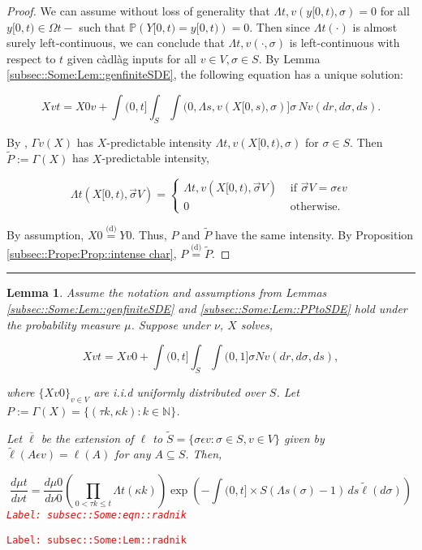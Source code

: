 \documentclass[12pt]{article}
\newcommand{\mb}{\mathbb}
\newcommand{\ov}{\overline}
\newcommand{\te}{\text}
\newcommand{\ep}{\epsilon}
\newcommand{\tr}{\textcolor{red}}
\newcommand{\labe}[1]{\tr{\texttt{Label: #1}}}
\newcommand{\ind}{\hspace{24pt}}
\newcommand{\lin}{\rule{\linewidth}{0.4 pt}}
\newcommand{\pr}{\mb{P}}							%
\newcommand{\deq}{\overset{\text{(d)}}{=}}			%
\newcommand{\defeq}{:=}								%
\renewcommand{\v}{v}							%
\renewcommand{\S}{S}							%
\newcommand{\s}{\sigma}							%
\newcommand{\sv}{\vec{\s}}						%
\newcommand{\ev}{\ep}							%
\renewcommand{\t}{t}							%
\renewcommand{\tt}{s}							%
\newcommand{\X}{X}								%
\newcommand{\poiss}{N}							%
\newcommand{\Sm}{\ell}							%
\renewcommand{\r}{r}							%
\newcommand{\alt}[1]{\widetilde{#1}}			%
\newcommand{\m}{\mu}							%
\newcommand{\mm}{\nu}							%
\newcommand{\XX}{Y}								%
\newcommand{\rt}{\tau}							%
\renewcommand{\it}{k}							%
\newcommand{\pmap}{\Gamma}						%
\renewcommand{\mark}{\kappa}					%
\newcommand{\rp}{P}								%
\newcommand{\typset}{A}							%
\newcommand{\ratee}{\Lambda}					%
\newcommand{\xx}{y}								%
\newtheorem{lem}[thms]{Lemma}
\begin{document}
\begin{proof}

We can assume without loss of generality that \(\ratee{\t,\v}(\xx{}{[0,\t)},\s) = 0\) for all \(\xx{}{[0,\t)}\in \Omega{}{\t-}\) such that \(\pr(\XX{}{[0,\t)} = \xx{}{[0,\t)}) = 0\). Then since \(\ratee{\t}(\cdot)\) is almost surely left-continuous, we can conclude that \(\ratee{\t,\v}(\cdot,\s)\) is left-continuous with respect to \(\t\) given c\`adl\`ag inputs for all \(\v\in V,\s\in\S\). By Lemma \ref{subsec::Some:Lem::genfiniteSDE}, the following equation has a unique solution:

\[\X{\v}{\t} = \X{0}{\v} + \int{(0,\t]}\int_\S\int{(0,\ratee{\tt,\v}(\X{}{[0,\tt)},\s)]}  \s\,\poiss{\v}(d\r,d\s,d\tt).\]

By \cite[Exercise 14.7.1]{DalVer08}, \(\pmap{\v}(\X{}{})\) has \(\X{}{}\)-predictable intensity \(\ratee{\t,\v}(\X{}{[0,\t)},\s)\) for \(\s \in \S\). Then \(\alt{\rp{}} \defeq \pmap{}(\X{}{})\) has \(\X{}{}\)-predictable intensity,

\[\ratee{\t}(\X{}{[0,\t)},\sv{}{V}) = \begin{cases}
\ratee{\t,\v}(\X{}{[0,\t)},\sv{}{V}) &\te{ if } \sv{}{V} = \s\ev{\v}\\
0&\te{ otherwise.}
\end{cases}\]

By assumption, \(\X{}{0} \deq \XX{}{0}\). Thus, \(\rp{}\) and \(\alt{\rp{}}\) have the same intensity. By Proposition \ref{subsec::Prope:Prop::intense char}, \(\rp{} \deq \alt{\rp{}}\).
\end{proof}
\lin

\begin{lem}
Assume the notation and assumptions from Lemmas \ref{subsec::Some:Lem::genfiniteSDE} and \ref{subsec::Some:Lem::PPtoSDE} hold under the probability measure \(\m{}{}{}\). Suppose under \(\mm{}{}{}\), \(\X{}{}\) solves,

\[\X{\v}{\t} = \X{\v}{0} +\int{(0,\t]}\int_\S\int{(0,1]} \s \poiss{\v}(d\r,d\s,d\tt),\]

where \(\{\X{\v}{0}\}_{\v \in V}\) are i.i.d uniformly distributed over \(\S\). Let \(\rp{} \defeq \pmap{}(\X{}{}) = \{(\rt{\it},\mark{\it}):\it\in \mb{N}\}\).

\ind Let \(\ov{\ell}\) be the extension of \(\Sm\) to \(\alt{\S} = \{\s\ev{\v}: \s \in \S, \v \in V\}\) given by \(\alt{\Sm}(\typset\ev{\v}) = \Sm(\typset)\) for any \(\typset \subseteq \S\). Then,

\begin{equation}
\frac{d\m{}{\t}{}}{d\mm{}{\t}{}}= \frac{d\m{}{0}{}}{d\mm{}{0}{}}\left(\prod_{0< \rt{\it}\leq \t} \ratee{\t}(\mark{\it})\right)\exp\left(-\int{(0,\t]\times \S} (\ratee{\tt}(\s) - 1)\,d\tt\alt{\Sm}(d\s)\right)
\label{subsec::Some:eqn::radnik}
\end{equation}
\labe{subsec::Some:eqn::radnik}
\label{subsec::Some:Lem::radnik}
\end{lem}
\labe{subsec::Some:Lem::radnik}
\end{document}

